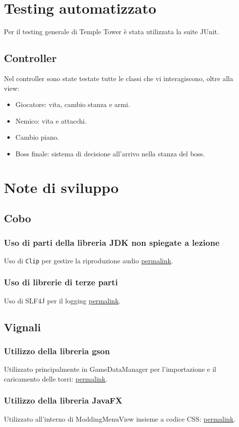 \documentclass[a4paper,12pt]{report}
\begin{document}
\section{Testing automatizzato}
Per il testing generale di Temple Tower è stata utilizzata la suite JUnit.
\subsection*{Controller}
Nel controller sono state testate tutte le classi che vi interagiscono, oltre alla view:
\begin{itemize}
 \item Giocatore: vita, cambio stanza e armi.
 \item Nemico: vita e attacchi.
 \item Cambio piano.
 \item Boss finale: sistema di decisione all'arrivo nella stanza del boss.
\end{itemize}

\section{Note di sviluppo}

\subsection{Cobo}
\subsubsection{Uso di parti della libreria JDK non spiegate a lezione}
Uso di \texttt{Clip} per gestire la riproduzione audio \href{https://google.com}{permalink}.
\subsubsection{Uso di librerie di terze parti}
Uso di SLF4J per il logging \href{https://google.com}{permalink}.

\subsection{Vignali}
\subsubsection{Utilizzo della libreria gson}
Utilizzato principalmente in GameDataManager per l'importazione e il caricamento delle torri: \href{https://google.com}{permalink}.
\subsubsection{Utilizzo della libreria JavaFX}
Utilizzato all'interno di ModdingMenuView insieme a codice CSS: \href{https://google.com}{permalink}.
\end{document}
